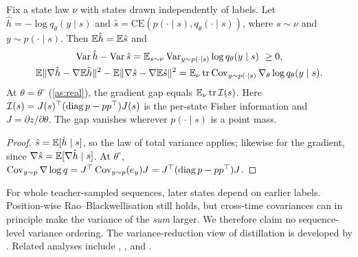 \begin{proposition}\label{prop:rb}
\Pv Fix a state law $\nu$ with states drawn independently of labels. Let $\hat h=-\log q_\theta(y\mid s)$ and
$\hat s=\mathrm{CE}(p(\cdot\mid s),q_\theta(\cdot\mid s))$, where $s\sim\nu$ and $y\sim p(\cdot\mid s)$. Then
$\mathbb{E}\hat h=\mathbb{E}\hat s$ and
\begin{gather*}
\operatorname{Var}\hat h-\operatorname{Var}\hat s=\mathbb{E}_{s\sim\nu}\operatorname{Var}_{y\sim p(\cdot\mid s)}\log q_\theta(y\mid s)\ \ge0,\\
\mathbb{E}\|\nabla\hat h-\nabla\mathbb{E}\hat h\|^2-\mathbb{E}\|\nabla\hat s-\nabla\mathbb{E}\hat s\|^2=\mathbb{E}_\nu\operatorname{tr}\operatorname{Cov}_{y\sim p(\cdot\mid s)}\nabla_\theta\log q_\theta(y\mid s).
\end{gather*}
At $\theta=\theta^\circ$ (\cref{as:real}), the gradient gap equals $\mathbb{E}_\nu\operatorname{tr}\mathcal I(s)$. Here
$\mathcal I(s)=J(s)^\top(\operatorname{diag} p-pp^\top)J(s)$ is the per-state Fisher information and $J=\partial z/\partial\theta$.
The gap vanishes wherever $p(\cdot\mid s)$ is a point mass.
\end{proposition}
\begin{proof}
$\hat s=\mathbb{E}[\hat h\mid s]$, so the law of total variance applies; likewise for the gradient, since
$\nabla\hat s=\mathbb{E}[\nabla\hat h\mid s]$. At $\theta^\circ$,
$\operatorname{Cov}_{y\sim p}\nabla\log q=J^\top\operatorname{Cov}_{y\sim p}(e_y)J=J^\top(\operatorname{diag} p-pp^\top)J$.
\end{proof}
\begin{remark}
For whole teacher-sampled sequences, later states depend on earlier labels. Position-wise
Rao--Blackwellisation still holds, but cross-time covariances can in principle make the variance of the
\emph{sum} larger. We therefore claim no sequence-level variance ordering. The variance-reduction view of
distillation is developed by \citet{menon2021statistical}. Related analyses include
\citet{lopezpaz2016unifying}, \citet{phuong2019towards}, \citet{dao2021knowledge} and
\citet{harutyunyan2023supervision}.
\end{remark}

